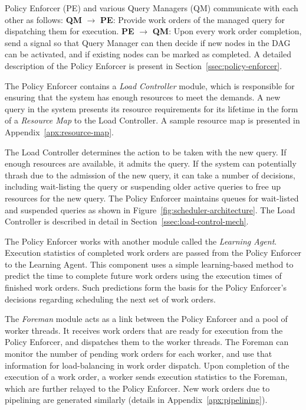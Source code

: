 Policy Enforcer (PE) and various Query Managers (QM) communicate with each other as follows:
\textbf{QM} $\rightarrow$ \textbf{PE}: Provide work orders of the managed query for dispatching them for execution.
\textbf{PE} $\rightarrow$ \textbf{QM}: Upon every work order completion, send a signal so that Query Manager can then decide if new nodes in the DAG can be activated, and if existing nodes can be marked as completed.
A detailed description of the Policy Enforcer is present in Section~\ref{ssec:policy-enforcer}. 

The Policy Enforcer contains a \textit{Load Controller} module, which is
responsible for ensuring that the system has enough resources to meet the
demands.
A new query in the system presents its resource requirements for its lifetime in the form of a \textit{Resource Map} to the Load Controller.
A sample resource map is presented in Appendix~\ref{apx:resource-map}.

The Load Controller determines the action to be taken with the new query. 
If enough resources are available, it admits the query.
If the system can potentially thrash due to the admission of the new query, it
can take a number of decisions, including wait-listing the query or suspending older active queries to free up resources for the new query.
The Policy Enforcer maintains queues for wait-listed and suspended queries as shown in Figure~\ref{fig:scheduler-architecture}.
The Load Controller is described in detail in Section~\ref{ssec:load-control-mech}.

The Policy Enforcer works with another module called the \textit{Learning Agent}. 
Execution statistics of completed work orders are passed from the Policy Enforcer to the Learning Agent.
This component uses a simple learning-based method to predict the time to 
complete future work orders using the execution times of finished work orders. 
Such predictions form the basis for the Policy Enforcer's decisions regarding scheduling the next set of work orders. 

The \textit{Foreman} module acts as a link between the Policy Enforcer and a pool of worker threads. 
It receives work orders that are ready for execution from the Policy Enforcer, and dispatches them to the worker threads. 
The Foreman can monitor the number of pending work orders for each worker, and 
use that information for load-balancing in work order dispatch.
Upon completion of the execution of a work order, a worker sends execution statistics to the Foreman, which are further relayed to the Policy Enforcer.
New work orders due to pipelining are generated similarly (details in Appendix~\ref{apx:pipelining}).

